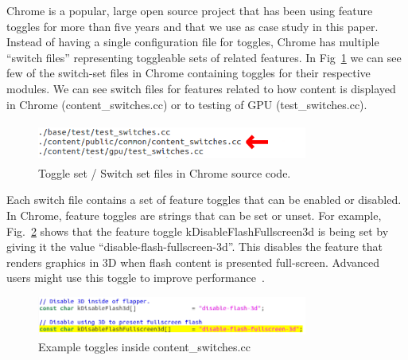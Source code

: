 \documentclass[conference]{IEEEtran}
\begin{document}
Chrome is a popular, large open source project that has been using feature toggles for more than five years and that we use as case study in this paper. 
Instead of having a single configuration file for toggles, Chrome has 
multiple “switch files” representing toggleable sets of related features. 
In Fig~\ref{fig:switch-sets} we can see few of the switch-set files 
in Chrome containing toggles for their respective modules. 
We can see switch files for features related to how content is 
displayed in Chrome (content\_switches.cc) or to testing of GPU 
(test\_switches.cc).
\begin{figure}
\includegraphics[height=0.5in,width=3.5in]{figure/switches.png}
\caption{Toggle set / Switch set files in Chrome source code.}
\label{fig:switch-sets}
\end{figure}
Each switch file contains a set of feature toggles that can
be enabled or disabled. In Chrome, feature toggles are strings
that can be set or unset. For example, Fig.~\ref{fig:content-toggles} 
shows that the
feature toggle kDisableFlashFullscreen3d is being set by
giving it the value “disable-flash-fullscreen-3d”. This disables
the feature that renders graphics in 3D when flash content is
presented full-screen. Advanced users might use this toggle
to improve performance~\cite{kDisableFlashFullscreen3d}.\\
\begin{figure}
\includegraphics[height=0.5in,width=3.5in]{figure/toggleassigned.png}
\caption{Example toggles inside content\_switches.cc}
\label{fig:content-toggles}
\end{figure}
\end{document}
